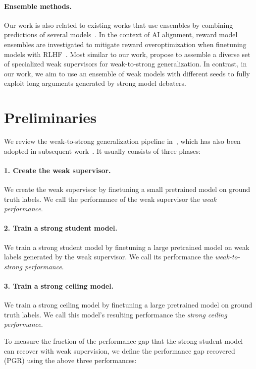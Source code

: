 \documentclass[letterpaper]{article} %
\begin{document}
\paragraph{Ensemble methods.} Our work is also related to existing works that use ensembles by combining predictions of several models~\cite{ganaie2022ensemble}.
In the context of AI alignment, reward model ensembles are investigated to mitigate reward overoptimization when finetuning models with RLHF~\cite{coste2023reward,eisenstein2023helping}.
Most similar to our work, \citet{liu2024co} propose to assemble a diverse set of specialized weak supervisors for weak-to-strong generalization.
In contrast, in our work, we aim to use an ensemble of weak models with different seeds to fully exploit long arguments generated by strong model debaters.


\section{Preliminaries}

We review the weak-to-strong generalization pipeline in~\cite{burns2023weak}, which has also been adopted in subsequent work~\cite{liu2024co,charikar2024quantifying}.
It usually consists of three phases:

\paragraph{1. Create the weak supervisor.} We create the weak supervisor by finetuning a small pretrained model on ground truth labels.
We call the performance of the weak supervisor the \textit{weak performance}.

\paragraph{2. Train a strong student model.} We train a strong student model by finetuning a large pretrained model on weak labels generated by the weak supervisor.
We call its performance the \textit{weak-to-strong performance}.

\paragraph{3. Train a strong ceiling model.} We train a strong ceiling model by finetuning a large pretrained model on ground truth labels.
We call this model’s resulting performance the \textit{strong ceiling performance}.

To measure the fraction of the performance gap that the strong student model can recover with weak supervision, we define the performance gap recovered (PGR) using the above three performances:
\end{document}
